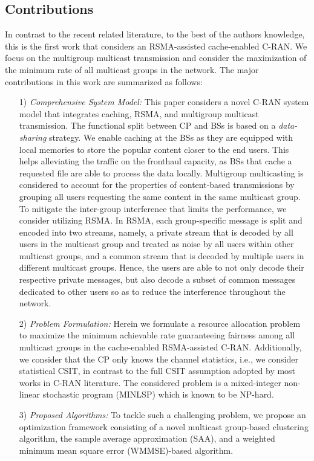 \documentclass[12pt,draftcls,onecolumn]{IEEEtran}
\theoremstyle{remark}
\theoremstyle{definition}
\begin{document}
\subsection{Contributions}
In contrast to the recent related literature, to the best of the authors knowledge, this is the first work that considers an RSMA-assisted cache-enabled C-RAN. We focus on the multigroup multicast transmission and consider the maximization of the minimum rate of all multicast groups in the network. The major contributions in this work are summarized as follows:
\begin{itemize}
\item[1)] \textit{Comprehensive System Model:} This paper considers a novel C-RAN system model that integrates caching, RSMA, and multigroup multicast transmission. The functional split between CP and BSs is based on a \emph{data-sharing} strategy. We enable caching at the BSs as they are equipped with local memories to store the popular content closer to the end users. This helps alleviating the traffic on the fronthaul capacity, as BSs that cache a requested file are able to process the data locally. Multigroup multicasting is considered to account for the properties of content-based transmissions by grouping all users requesting the same content in the same multicast group. To mitigate the inter-group interference that limits the performance, we consider utilizing RSMA. In RSMA, each group-specific message is split and encoded into two streams, namely, a private stream that is decoded by all users in the multicast group and treated as noise by all users within other multicast groups, and a common stream that is decoded by multiple users in different multicast groups. Hence, the users are able to not only decode their respective private messages, but also decode a subset of common messages dedicated to other users so as to reduce the interference throughout the network.
\item[2)] \textit{Problem Formulation:} Herein we formulate a resource allocation problem to maximize the minimum achievable rate guaranteeing fairness among all multicast groups in the cache-enabled RSMA-assisted C-RAN. Additionally, we consider that the CP only knows the channel statistics, i.e., we consider statistical CSIT, in contrast to the full CSIT assumption adopted by most works in C-RAN literature. The considered problem is a mixed-integer non-linear stochastic program (MINLSP) which is known to be NP-hard.
\item[3)] \textit{Proposed Algorithms:} To tackle such a challenging problem, we propose an optimization framework consisting of a novel multicast group-based clustering algorithm, the sample average approximation (SAA), and a weighted minimum mean square error (WMMSE)-based algorithm. 

\end{itemize}
\end{document}

